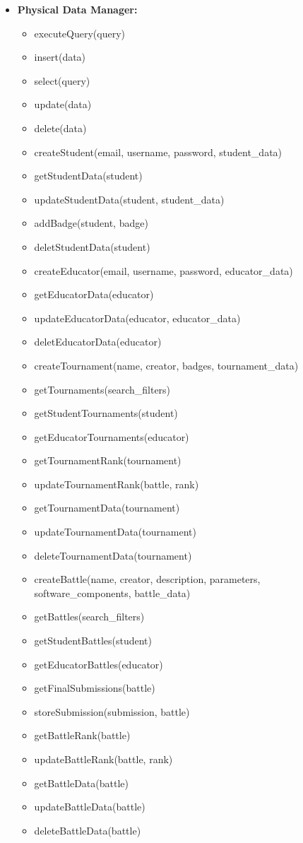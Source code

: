 \begin{itemize}
    \item \textbf{Physical Data Manager:}
    \begin{itemize}
        \item executeQuery(query)
        \item insert(data)
        \item select(query)
        \item update(data)
        \item delete(data)
    
        \item createStudent(email, username, password, student\_data)
        \item getStudentData(student)
        \item updateStudentData(student, student\_data)
        \item addBadge(student, badge)
        \item deletStudentData(student)

        \item createEducator(email, username, password, educator\_data)
        \item getEducatorData(educator)
        \item updateEducatorData(educator, educator\_data)
        \item deletEducatorData(educator)

        \item createTournament(name, creator, badges, tournament\_data)
        \item getTournaments(search\_filters)
        \item getStudentTournaments(student)
        \item getEducatorTournaments(educator)
        \item getTournamentRank(tournament)
        \item updateTournamentRank(battle, rank)
        \item getTournamentData(tournament)
        \item updateTournamentData(tournament)
        \item deleteTournamentData(tournament)

        \item createBattle(name, creator, description, parameters, software\_components, battle\_data)
        \item getBattles(search\_filters)
        \item getStudentBattles(student)
        \item getEducatorBattles(educator)
        \item getFinalSubmissions(battle)
        \item storeSubmission(submission, battle)
        \item getBattleRank(battle)
        \item updateBattleRank(battle, rank)
        \item getBattleData(battle)
        \item updateBattleData(battle)
        \item deleteBattleData(battle)
        

\end{itemize}
\end{itemize}
